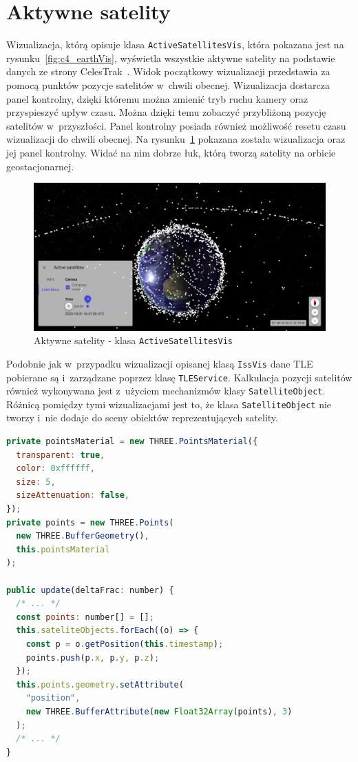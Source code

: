 \section{Aktywne satelity}

Wizualizacja, którą opisuje klasa \texttt{ActiveSatellitesVis}, która pokazana jest na rysunku~\ref{fig:c4_earthVis}, wyświetla wszystkie aktywne satelity na podstawie danych ze strony CelesTrak~\cite{CelesTrak}. Widok początkowy wizualizacji przedstawia za pomocą punktów pozycje satelitów w~chwili obecnej. Wizualizacja dostarcza panel kontrolny, dzięki któremu można zmienić tryb ruchu kamery oraz przyspieszyć upływ czasu. Można dzięki temu zobaczyć przybliżoną pozycję satelitów w~przyszłości. Panel kontrolny posiada również możliwość resetu czasu wizualizacji do chwili obecnej. Na rysunku~\ref{fig:c4_activeSatellitesVis} pokazana została wizualizacja oraz jej panel kontrolny. Widać na nim dobrze łuk, którą tworzą satelity na orbicie geostacjonarnej.

\begin{figure}
  \centering
  \includegraphics[width=\linewidth]{img/c4_activeSatellitesVis.png}
  \caption{Aktywne satelity - klasa \texttt{ActiveSatellitesVis}}
  \label{fig:c4_activeSatellitesVis} 
\end{figure}

Podobnie jak w~przypadku wizualizacji opisanej klasą \texttt{IssVis} dane TLE pobierane są i~zarządzane poprzez klasę \texttt{TLEService}. Kalkulacja pozycji satelitów również wykonywana jest z~użyciem mechanizmów klasy \texttt{SatelliteObject}. Różnicą pomiędzy tymi wizualizacjami jest to, że klasa \texttt{SatelliteObject} nie tworzy i~nie dodaje do sceny obiektów reprezentujących satelity. 

\begin{lstlisting}[float, language=javascript, label={lst:active1}, caption={
  Fragmenty klasy \texttt{ActiveSatellitesVis}}
]
private pointsMaterial = new THREE.PointsMaterial({
  transparent: true,
  color: 0xffffff,
  size: 5,
  sizeAttenuation: false,
});
private points = new THREE.Points(
  new THREE.BufferGeometry(),
  this.pointsMaterial
);

public update(deltaFrac: number) {
  /* ... */
  const points: number[] = [];
  this.sateliteObjects.forEach((o) => {
    const p = o.getPosition(this.timestamp);
    points.push(p.x, p.y, p.z);
  });
  this.points.geometry.setAttribute(
    "position",
    new THREE.BufferAttribute(new Float32Array(points), 3)
  );
  /* ... */
}
\end{lstlisting}

